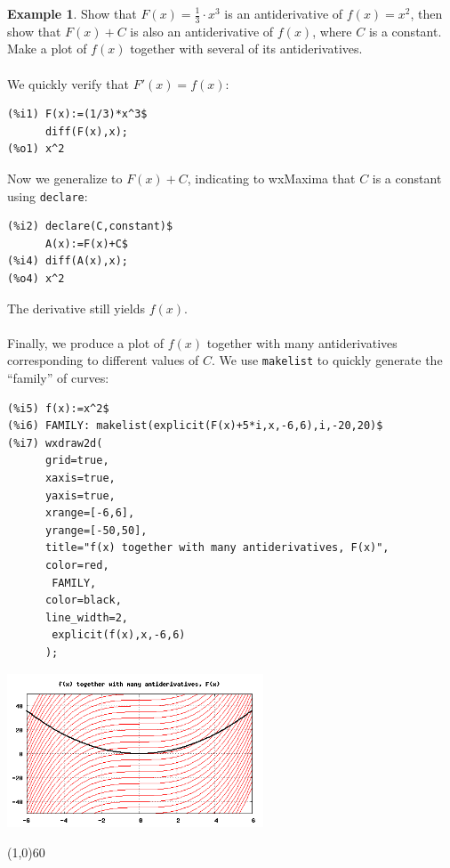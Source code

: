 \documentclass[10.5pt,twoside]{report}
\theoremstyle{definition}
\newtheorem{exmp}{Example}[section]
\begin{document}
\begin{exmp}  Show that $F(x)=\frac{1}{3} \cdot x^3$ is an antiderivative of $f(x)=x^2$, then show that $F(x)+C$ is also an antiderivative of $f(x)$, where $C$ is a constant.  Make a plot of $f(x)$ together with several of its antiderivatives.\\
${}$\\

We quickly verify that $F'(x)=f(x)$:

\begin{verbatim}
(%i1) F(x):=(1/3)*x^3$
      diff(F(x),x);
(%o1) x^2
\end{verbatim}

Now we generalize to $F(x)+C$, indicating to wxMaxima that $C$ is a constant using \verb|declare|:

\begin{verbatim}
(%i2) declare(C,constant)$
      A(x):=F(x)+C$
(%i4) diff(A(x),x);
(%o4) x^2
\end{verbatim}

The derivative still yields $f(x)$.\\
${}$\\
Finally, we produce a plot of $f(x)$ together with many antiderivatives corresponding to different values of $C$.  We use \verb|makelist| to quickly generate the ``family'' of curves:

\begin{verbatim}
(%i5) f(x):=x^2$
(%i6) FAMILY: makelist(explicit(F(x)+5*i,x,-6,6),i,-20,20)$
(%i7) wxdraw2d(
      grid=true,
      xaxis=true,
      yaxis=true,
      xrange=[-6,6],
      yrange=[-50,50],
      title="f(x) together with many antiderivatives, F(x)",
      color=red,
       FAMILY,
      color=black,
      line_width=2,
       explicit(f(x),x,-6,6)
      );
\end{verbatim}

\includegraphics[width=3in]{example_7_1_1}


\end{exmp}

\line(1,0){60}
\linethickness{0.5mm}
\end{document}
